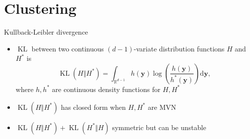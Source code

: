 \documentclass[14pt,aspectratio=169]{beamer}
\DeclareMathOperator{\KL}{KL}
\begin{document}
\section{Clustering}

\begin{frame}{Kullback-Leibler divergence}
  \begin{itemize} \setlength{\itemsep}{2pt}
  \item $\KL{}$ between two continuous $(d-1)$-variate distribution functions $H$ and $H^*$ is 
    \begin{equation*}
      \KL{(H \Vert H^*)} = \int_{\mathbb{R}^{d-1}} h(\boldsymbol{y}) \log\left(\frac{h(\boldsymbol{y})}{h^*(\boldsymbol{y})}\right) \mathrm{d}\boldsymbol{y},
    \end{equation*}
    where $h, h^*$ are continuous density functions for $H, H^*$
  \item <2-> $\KL(H \Vert H^*)$ has closed form when $H, H^*$ are $\mathrm{MVN}$
  \item <3-> $\KL{(H \Vert H^*)} + \KL{(H^* \Vert H)}$ symmetric but can be unstable
  \end{itemize}
\end{frame}
\end{document}

